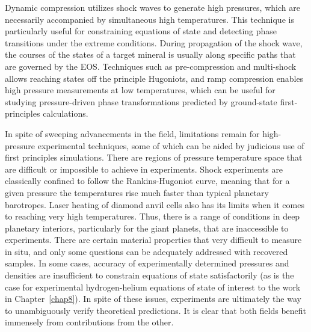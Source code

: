 Dynamic compression utilizes shock waves to generate high pressures, which are
necessarily accompanied by simultaneous high temperatures. This technique is
particularly useful for constraining equations of state and detecting phase
transitions under the extreme conditions. During propagation of the shock wave,
the courses of the states of a target mineral is usually along specific paths
that are governed by the EOS. Techniques such as pre-compression and
multi-shock allows reaching states off the principle Hugoniots, and ramp
compression enables high pressure measurements at low temperatures, which can
be useful for studying pressure-driven phase transformations predicted by
ground-state first-principles calculations.

In spite of sweeping advancements in the field, limitations remain for
high-pressure experimental techniques, some of which can be aided by judicious
use of first principles simulations. There are regions of pressure temperature
space that are difficult or impossible to achieve in experiments. Shock
experiments are classically confined to follow the Rankins-Hugoniot curve,
meaning that for a given pressure the temperatures rise much faster than
typical planetary barotropes. Laser heating of diamond anvil cells also has its
limits when it comes to reaching very high temperatures. Thus, there is a range
of conditions in deep planetary interiors, particularly for the giant planets,
that are inaccessible to experiments. There are certain material properties
that very difficult to measure in situ, and only some questions can be
adequately addressed with recovered samples. In some cases, accuracy of
experimentally determined pressures and densities are insufficient to constrain
equations of state satisfactorily (as is the case for experimental
hydrogen-helium equations of state of interest to the work in
Chapter~\ref{chap8}). In spite of these issues, experiments are ultimately the
way to unambiguously verify theoretical predictions. It is clear that both
fields benefit immensely from contributions from the other.

